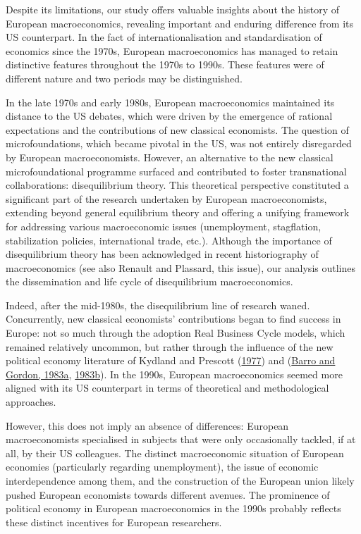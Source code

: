 \documentclass[
  12pt,
  onecolumn]{article}
\begin{document}
Despite its limitations, our study offers valuable insights about the
history of European macroeconomics, revealing important and enduring
difference from its US counterpart. In the fact of internationalisation
and standardisation of economics since the 1970s, European
macroeconomics has managed to retain distinctive features throughout the
1970s to 1990s. These features were of different nature and two periods
may be distinguished.

In the late 1970s and early 1980s, European macroeconomics maintained
its distance to the US debates, which were driven by the emergence of
rational expectations and the contributions of new classical economists.
The question of microfoundations, which became pivotal in the US, was
not entirely disregarded by European macroeconomists. However, an
alternative to the new classical microfoundational programme surfaced
and contributed to foster transnational collaborations: disequilibrium
theory. This theoretical perspective constituted a significant part of
the research undertaken by European macroeconomists, extending beyond
general equilibrium theory and offering a unifying framework for
addressing various macroeconomic issues (unemployment, stagflation,
stabilization policies, international trade, etc.). Although the
importance of disequilibrium theory has been acknowledged in recent
historiography of macroeconomics (see also Renault and Plassard, this
issue), our analysis outlines the dissemination and life cycle of
disequilibrium macroeconomics.

Indeed, after the mid-1980s, the disequilibrium line of research waned.
Concurrently, new classical economists' contributions began to find
success in Europe: not so much through the adoption Real Business Cycle
models, which remained relatively uncommon, but rather through the
influence of the new political economy literature of Kydland and
Prescott (\protect\hyperlink{ref-kydland1977}{1977}) and
(\protect\hyperlink{ref-barro1983}{Barro and Gordon, 1983a},
\protect\hyperlink{ref-barro1983c}{1983b}). In the 1990s, European
macroeconomics seemed more aligned with its US counterpart in terms of
theoretical and methodological approaches.

However, this does not imply an absence of differences: European
macroeconomists specialised in subjects that were only occasionally
tackled, if at all, by their US colleagues. The distinct macroeconomic
situation of European economies (particularly regarding unemployment),
the issue of economic interdependence among them, and the construction
of the European union likely pushed European economists towards
different avenues. The prominence of political economy in European
macroeconomics in the 1990s probably reflects these distinct incentives
for European researchers.
\end{document}
